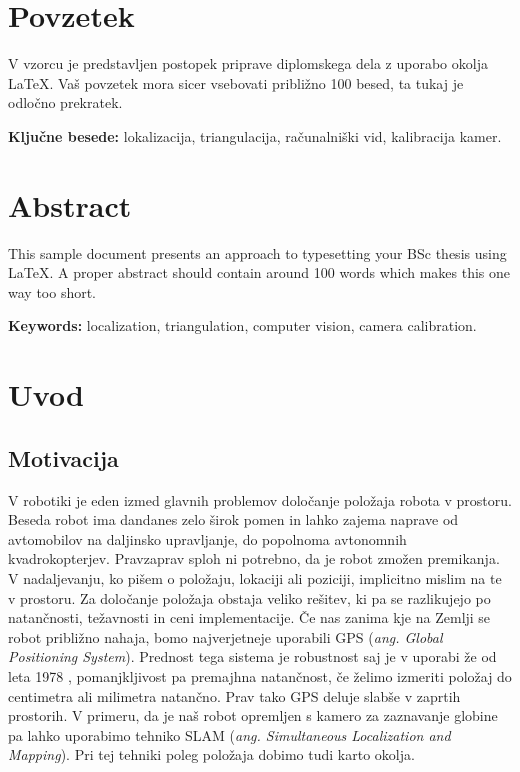 \documentclass[a4paper, 12pt]{book}
\newcommand{\tkeywords}{lokalizacija, triangulacija, računalniški vid, kalibracija kamer}
\newcommand{\tkeywordsEn}{localization, triangulation, computer vision, camera calibration}
\newcommand{\clearemptydoublepage}{\newpage{\pagestyle{empty}\cleardoublepage}}
\begin{document}
\chapter*{Povzetek}
V vzorcu je predstavljen postopek priprave diplomskega dela z uporabo okolja \LaTeX. Vaš povzetek mora sicer vsebovati približno 100 besed, ta tukaj je odločno prekratek.
\bigskip

\noindent\textbf{Ključne besede:} \tkeywords.
\clearemptydoublepage

\chapter*{Abstract}
This sample document presents an approach to typesetting your BSc thesis using \LaTeX. A proper abstract should contain around 100 words which makes this one way too short.
\bigskip

\noindent\textbf{Keywords:} \tkeywordsEn.
\clearemptydoublepage

\mainmatter
\setcounter{page}{1}
\pagestyle{fancy}

\chapter{Uvod}
\section{Motivacija}
V robotiki je eden izmed glavnih problemov določanje položaja robota v prostoru. Beseda robot ima dandanes zelo širok pomen in lahko zajema naprave od avtomobilov na daljinsko upravljanje, do popolnoma avtonomnih kvadrokopterjev. Pravzaprav sploh ni potrebno, da je robot zmožen premikanja. V nadaljevanju, ko pišem o položaju, lokaciji ali poziciji, implicitno mislim na te v prostoru. Za določanje položaja obstaja veliko rešitev, ki pa se razlikujejo po natančnosti, težavnosti in ceni implementacije. Če nas zanima kje na Zemlji se robot približno nahaja, bomo najverjetneje uporabili GPS (\emph{ang. Global Positioning System}). Prednost tega sistema je robustnost saj je v uporabi že od leta 1978 \cite{wiki:gps}, pomanjkljivost pa premajhna natančnost, če želimo izmeriti položaj do centimetra ali milimetra natančno. Prav tako GPS deluje slabše v zaprtih prostorih. V primeru, da je naš robot opremljen s kamero za zaznavanje globine pa lahko uporabimo tehniko SLAM (\emph{ang. Simultaneous Localization and Mapping}). Pri tej tehniki poleg položaja dobimo tudi karto okolja.
\end{document}
